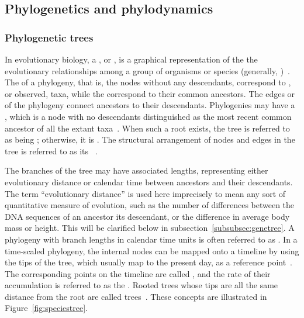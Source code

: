 \subsection{Phylogenetics and phylodynamics}

\subsubsection{Phylogenetic trees}

In evolutionary biology, a , or , is a
graphical representation of the the evolutionary relationships among a group of
organisms or species (generally, )~\autocite{haeckel1866generelle}.
The  of a phylogeny, that is, the nodes without any descendants,
correspond to , or observed, taxa, while the 
correspond to their common ancestors. The edges or  of the
phylogeny connect ancestors to their descendants. Phylogenies may have a
, which is a node with no descendants distinguished as the most
recent common ancestor of all the extant
taxa~\autocite{harding1971probabilities}. When such a root exists, the tree is
referred to as being ; otherwise, it is . The
structural arrangement of nodes and edges in the tree is referred to as its
~\autocite{cavalli1967phylogenetic}. 

The branches of the tree may have associated lengths, representing either
evolutionary distance or calendar time between ancestors and their descendants.
The term ``evolutionary distance'' is used here imprecisely to mean any sort of
quantitative measure of evolution, such as the number of differences between
the DNA sequences of an ancestor its descendant, or the difference in average
body mass or height. This will be clarified below in
subsection~\ref{subsubsec:genetree}. A phylogeny with branch lengths in calendar
time units is often referred to as . In a time-scaled
phylogeny, the internal nodes can be mapped onto a timeline by using the tips
of the tree, which usually map to the present day, as a reference
point~\autocite{nee1992tempo}. The corresponding points on the timeline are
called , and the rate of their accumulation is referred
to as the . Rooted trees whose tips are all the same
distance from the root are called 
trees~\autocite{buneman1974note}. These concepts are illustrated in
Figure~\ref{fig:speciestree}.

